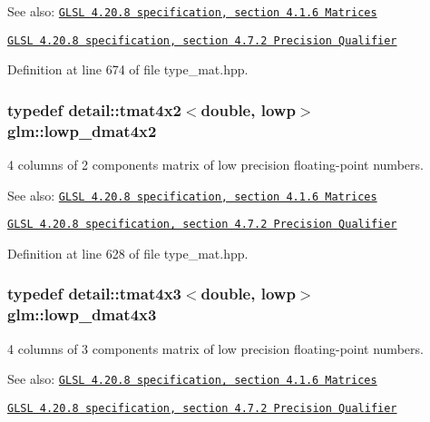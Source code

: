 \begin{Desc}
\item[See also:]\href{http://www.opengl.org/registry/doc/GLSLangSpec.4.20.8.pdf}{\tt GLSL 4.20.8 specification, section 4.1.6 Matrices} 

\href{http://www.opengl.org/registry/doc/GLSLangSpec.4.20.8.pdf}{\tt GLSL 4.20.8 specification, section 4.7.2 Precision Qualifier} \end{Desc}


Definition at line 674 of file type\_\-mat.hpp.\hypertarget{group__core__precision_g28a7ef670069c3707f19b9de1039517e}{
\subsubsection[lowp\_\-dmat4x2]{\setlength{\rightskip}{0pt plus 5cm}typedef detail::tmat4x2$<$double, lowp$>$ {\bf glm::lowp\_\-dmat4x2}}}
\label{group__core__precision_g28a7ef670069c3707f19b9de1039517e}


4 columns of 2 components matrix of low precision floating-point numbers.

\begin{Desc}
\item[See also:]\href{http://www.opengl.org/registry/doc/GLSLangSpec.4.20.8.pdf}{\tt GLSL 4.20.8 specification, section 4.1.6 Matrices} 

\href{http://www.opengl.org/registry/doc/GLSLangSpec.4.20.8.pdf}{\tt GLSL 4.20.8 specification, section 4.7.2 Precision Qualifier} \end{Desc}


Definition at line 628 of file type\_\-mat.hpp.\hypertarget{group__core__precision_gbc1be51eb0cae7cd4b1d6483a954c35d}{
\subsubsection[lowp\_\-dmat4x3]{\setlength{\rightskip}{0pt plus 5cm}typedef detail::tmat4x3$<$double, lowp$>$ {\bf glm::lowp\_\-dmat4x3}}}
\label{group__core__precision_gbc1be51eb0cae7cd4b1d6483a954c35d}


4 columns of 3 components matrix of low precision floating-point numbers.

\begin{Desc}
\item[See also:]\href{http://www.opengl.org/registry/doc/GLSLangSpec.4.20.8.pdf}{\tt GLSL 4.20.8 specification, section 4.1.6 Matrices} 

\href{http://www.opengl.org/registry/doc/GLSLangSpec.4.20.8.pdf}{\tt GLSL 4.20.8 specification, section 4.7.2 Precision Qualifier} \end{Desc}


